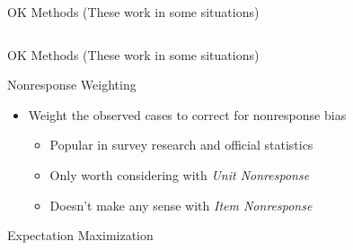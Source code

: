 \documentclass{beamer}\usepackage[]{graphicx}\usepackage[]{color}
\makeatletter
\newenvironment{kframe}{%
 \def\at@end@of@kframe{}%
 \ifinner\ifhmode%
  \def\at@end@of@kframe{\end{minipage}}%
  \begin{minipage}{\columnwidth}%
 \fi\fi%
 \def\FrameCommand##1{\hskip\@totalleftmargin \hskip-\fboxsep
 \colorbox{shadecolor}{##1}\hskip-\fboxsep
     \hskip-\linewidth \hskip-\@totalleftmargin \hskip\columnwidth}%
 \MakeFramed {\advance\hsize-\width
   \@totalleftmargin\z@ \linewidth\hsize
   \@setminipage}}%
 {\par\unskip\endMakeFramed%
 \at@end@of@kframe}
\newenvironment{knitrout}{}{} %
\makeatother
\begin{document}
\begin{frame}{OK Methods (These work in some situations)}
\begin{columns}
\end{columns}

\end{frame}

\watermarkon %

\begin{frame}{OK Methods (These work in some situations)}

  Nonresponse Weighting
  \vc
  \begin{itemize}
  \item Weight the observed cases to correct for nonresponse bias
    \vc
    \begin{itemize}
    \item Popular in survey research and official statistics
      \vc
    \item Only worth considering with \emph{Unit Nonresponse}
      \vc
    \item Doesn't make any sense with \emph{Item Nonresponse}
    \end{itemize}
  \end{itemize}

\end{frame}


\begin{frame}{Expectation Maximization}

\end{frame}

\end{document}
